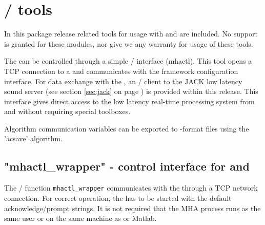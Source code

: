 
\section{\Octave{}/ \Matlab{} tools}%
\label{sec:matlab}%

In this package release \mha{} related tools for usage with \Octave{} and \Matlab{} are included.
%
No support
is granted for these modules, nor give we any warranty for usage of
these tools.

The \mhad{} can be controlled through a simple \Octave{}/ \Matlab{}
interface (mhactl). This tool opens a TCP connection to a \mhad{} and
communicates with the framework configuration interface.
%
For data exchange with the \mha{}, an \Octave{}/ \Matlab{} client to the JACK low latency sound server (see section \ref{sec:jack} on page
\pageref{sec:jack}) is provided within this release.
%
This interface gives direct access to the low latency real-time
processing system from \Octave{} and \Matlab{} without requiring special toolboxes.

Algorithm communication variables can be exported to \Matlab{}-format files
using the 'acsave' algorithm.

\subsection{"mhactl\_wrapper" - \mha{} control interface for \Octave{} and \Matlab{}}
\label{sec:mhactl}

The  \Octave{}/ \Matlab{} function \verb!mhactl_wrapper! communicates with the \mhad{}
through a TCP network connection.
%
For correct operation, the \mhad{} has to be started with the
default acknowledge/prompt strings.
%
It is not required that the MHA process runs as the same user or on
the same machine as \Octave{} or Matlab{}.

